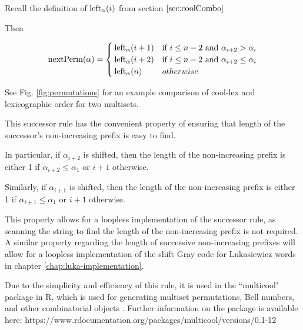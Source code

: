 Recall the definition of $\leftshift[\alpha]{i}$ from section $\ref{sec:coolCombo}$



Then

\begin{equation*}
    \text{nextPerm}(\alpha) = \begin{cases}
	\leftshift[\alpha]{i+1} & \text{if $i \le n-2$ and $\alpha_{i+2} > \alpha_i$}\\
	\leftshift[\alpha]{i+2} & \text{if $i \le n-2$ and $\alpha_{i+2} \le \alpha_i$}\\
	\leftshift[\alpha]{n} & otherwise\\
\end{cases}
\end{equation*}


See Fig. \ref{fig:permutations} for an example comparison of cool-lex and lexicographic order for two multisets.

This successor rule has the convenient property of ensuring that length of the successor's non-increasing prefix is easy to find.

In particular, if $\alpha_{i+2}$ is shifted, then the length of the non-increasing prefix is either 1 if $\alpha_{i+2}\le \alpha_1$ or $i+1$ otherwise. 

Similarly, if $\alpha_{i+1}$ is shifted, then the length of the non-increasing prefix is either 1 if $\alpha_{i+1}\le \alpha_1$ or $i+1$ otherwise. 


This property allows for a loopless implementation of the successor rule, as scanning the string to find the length of the non-increasing prefix is not required.  
A similar property regarding the length of successive non-increasing prefixes will allow for a loopless implementation of the shift Gray code for Lukasiewicz words in chapter \ref{chap:luka-implementation}.

Due to the simplicity and efficiency of this rule, it is used in the ``multicool" package in R, which is used for generating multiset permutations, Bell numbers, and other combinatorial objects \cite{multicool_2021}.   Further information on the package is available here: https://www.rdocumentation.org/packages/multicool/versions/0.1-12




